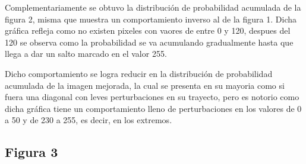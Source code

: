 \documentclass[11pt, letterpaper]{article}
\begin{document}
Complementariamente se obtuvo la distribución de probabilidad acumulada de la figura 2, misma que muestra un comportamiento inverso al de la figura 1. Dicha gráfica refleja como no existen pixeles con vaores de entre 0 y 120, despues del 120 se observa como la probabilidad se va acumulando gradualmente hasta que llega a dar un salto marcado en el valor 255.

Dicho comportamiento se logra reducir en la distribución de probabilidad acumulada de la imagen mejorada, la cual se presenta en su mayoria como si fuera una diagonal con leves perturbaciones en su trayecto, pero es notorio como dicha gráfica tiene un comportamiento lleno de perturbaciones en los valores de 0 a 50 y de 230 a 255, es decir, en los extremos.

\newpage

\subsection{Figura 3}
\end{document}
